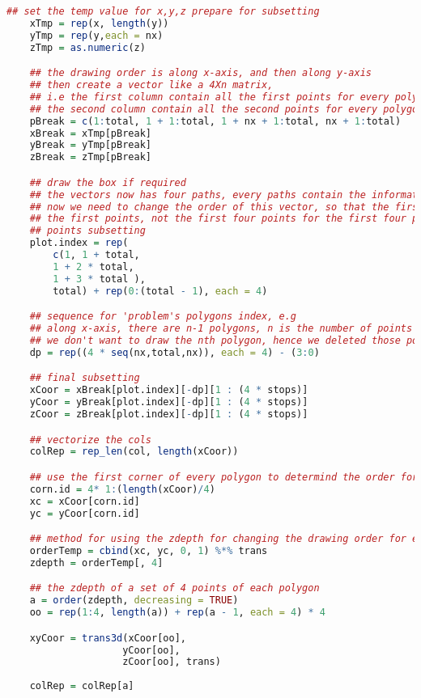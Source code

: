 \begin{lstlisting}[language = R]
    ## set the temp value for x,y,z prepare for subsetting
    xTmp = rep(x, length(y))
    yTmp = rep(y,each = nx)
    zTmp = as.numeric(z)

    ## the drawing order is along x-axis, and then along y-axis
    ## then create a vector like a 4Xn matrix, 
    ## i.e the first column contain all the first points for every polygons
    ## the second column contain all the second points for every polygons and so on 
    pBreak = c(1:total, 1 + 1:total, 1 + nx + 1:total, nx + 1:total)
    xBreak = xTmp[pBreak]
    yBreak = yTmp[pBreak]
    zBreak = zTmp[pBreak]

    ## draw the box if required
    ## the vectors now has four paths, every paths contain the information of every points of every polygon
    ## now we need to change the order of this vector, so that the first four index should be the order for drawing 
    ## the first points, not the first four points for the first four polygon
    ## points subsetting 
    plot.index = rep(
        c(1, 1 + total, 
        1 + 2 * total, 
        1 + 3 * total ),
        total) + rep(0:(total - 1), each = 4)

    ## sequence for 'problem's polygons index, e.g
    ## along x-axis, there are n-1 polygons, n is the number of points in x direction
    ## we don't want to draw the nth polygon, hence we deleted those polygon
    dp = rep((4 * seq(nx,total,nx)), each = 4) - (3:0)

    ## final subsetting
    xCoor = xBreak[plot.index][-dp][1 : (4 * stops)]
    yCoor = yBreak[plot.index][-dp][1 : (4 * stops)]
    zCoor = zBreak[plot.index][-dp][1 : (4 * stops)]

    ## vectorize the cols
    colRep = rep_len(col, length(xCoor))

    ## use the first corner of every polygon to determind the order for drawing
    corn.id = 4* 1:(length(xCoor)/4)
    xc = xCoor[corn.id]
    yc = yCoor[corn.id]

    ## method for using the zdepth for changing the drawing order for every polygon
    orderTemp = cbind(xc, yc, 0, 1) %*% trans 
    zdepth = orderTemp[, 4]

    ## the zdepth of a set of 4 points of each polygon
    a = order(zdepth, decreasing = TRUE)
    oo = rep(1:4, length(a)) + rep(a - 1, each = 4) * 4

    xyCoor = trans3d(xCoor[oo],
                    yCoor[oo],
                    zCoor[oo], trans)
                    
    colRep = colRep[a]


\end{lstlisting}
